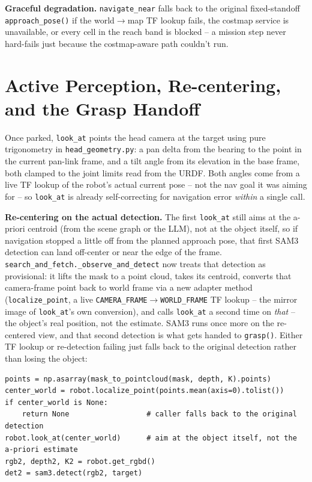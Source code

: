 \documentclass[11pt]{article}
\begin{document}
\textbf{Graceful degradation.} \texttt{navigate\_near} falls back to the original
fixed-standoff \texttt{approach\_pose()} if the world$\to$map TF lookup fails, the
costmap service is unavailable, or every cell in the reach band is blocked -- a
mission step never hard-fails just because the costmap-aware path couldn't run.

\section*{Active Perception, Re-centering, and the Grasp Handoff}

Once parked, \texttt{look\_at} points the head camera at the target using pure
trigonometry in \texttt{head\_geometry.py}: a pan delta from the bearing to the point
in the current pan-link frame, and a tilt angle from its elevation in the base frame,
both clamped to the joint limits read from the URDF. Both angles come from a live TF
lookup of the robot's actual current pose -- not the nav goal it was aiming for -- so
\texttt{look\_at} is already self-correcting for navigation error \emph{within} a
single call.

\textbf{Re-centering on the actual detection.} The first \texttt{look\_at} still aims
at the a-priori centroid (from the scene graph or the LLM), not at the object itself,
so if navigation stopped a little off from the planned approach pose, that first SAM3
detection can land off-center or near the edge of the frame.
\texttt{search\_and\_fetch.\_observe\_and\_detect} now treats that detection as
provisional: it lifts the mask to a point cloud, takes its centroid, converts that
camera-frame point back to world frame via a new adapter method
(\texttt{localize\_point}, a live \texttt{CAMERA\_FRAME}$\to$\texttt{WORLD\_FRAME} TF
lookup -- the mirror image of \texttt{look\_at}'s own conversion), and calls
\texttt{look\_at} a second time on \emph{that} -- the object's real position, not the
estimate. SAM3 runs once more on the re-centered view, and that second detection is
what gets handed to \texttt{grasp()}. Either TF lookup or re-detection failing just
falls back to the original detection rather than losing the object:
\begin{lstlisting}[caption={search\_and\_fetch.py -- re-centering before grasping}]
points = np.asarray(mask_to_pointcloud(mask, depth, K).points)
center_world = robot.localize_point(points.mean(axis=0).tolist())
if center_world is None:
    return None                  # caller falls back to the original detection
robot.look_at(center_world)      # aim at the object itself, not the a-priori estimate
rgb2, depth2, K2 = robot.get_rgbd()
det2 = sam3.detect(rgb2, target)
\end{lstlisting}
\end{document}
